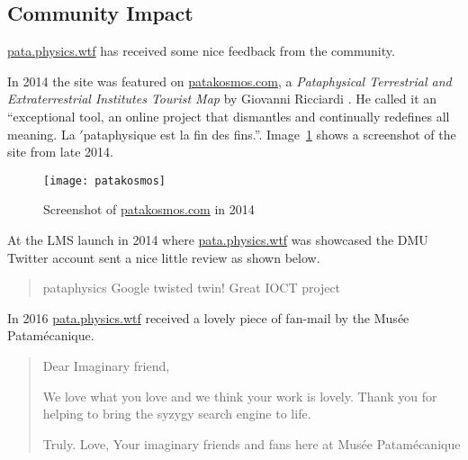 \subsection{Community Impact}

\url{pata.physics.wtf} has received some nice feedback from the community. 

In 2014 the site was featured on \url{patakosmos.com}, a \textit{Pataphysical Terrestrial and Extraterrestrial Institutes Tourist Map} by Giovanni Ricciardi \autocite*{Ricciardi2014}. He called it an ``exceptional tool, an online project that dismantles and continually redefines all meaning. La $'$pataphysique est la fin des fins.''. Image~\ref{img:patakosmos} shows a screenshot of the site from late 2014.

\begin{figure}[!htbp]
  \centering
  \texttt{[image: patakosmos]}
\caption[Screenshot of \url{patakosmos.com} in 2014]{Screenshot of \url{patakosmos.com} in 2014}
\label{img:patakosmos}
\end{figure}

At the \ac{LMS} launch in 2014 where \url{pata.physics.wtf} was showcased the \ac{DMU} Twitter account sent a nice little review as shown below.

\begin{quotation}
  pataphysics Google twisted twin! Great IOCT project 
\end{quotation}

In 2016 \url{pata.physics.wtf} received a lovely piece of fan-mail by the Mus{\'e}e Patam{\'e}canique.

\begin{quotation}
  Dear Imaginary friend,

  We love what you love and we think your work is lovely. 
  Thank you for helping to bring the syzygy search engine to life.

  Truly. 
  Love,
  Your imaginary friends and fans here at Mus{\'e}e Patam{\'e}canique 
\end{quotation}


\stopcontents[chapters]
